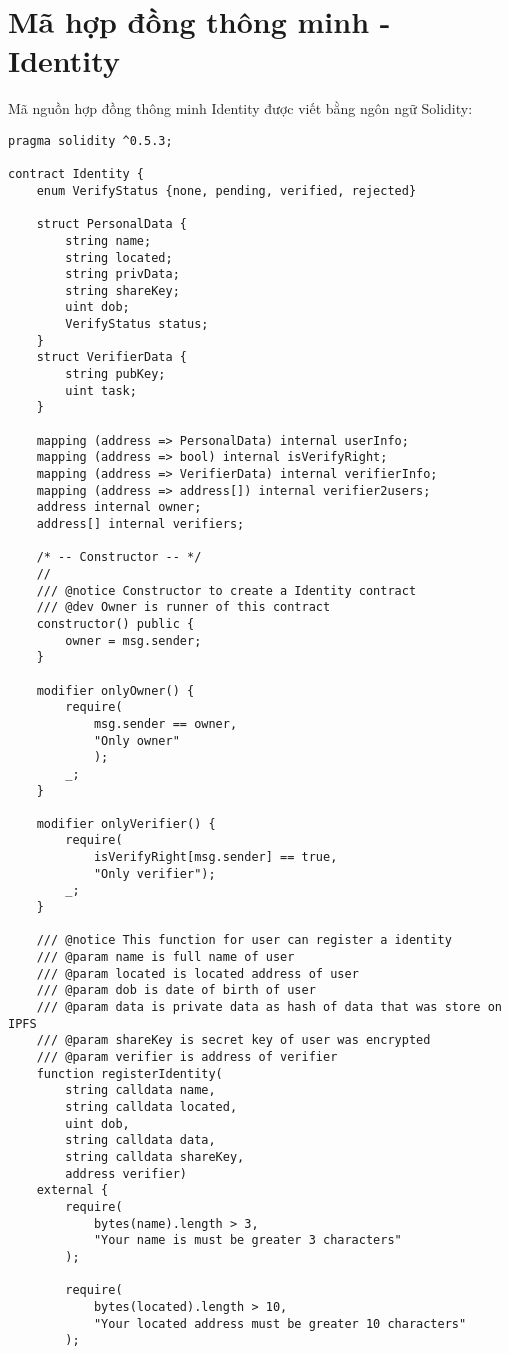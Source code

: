 \documentclass[../main-report.tex]{subfiles}
\begin{document}
\chapter{Mã hợp đồng thông minh - Identity}
Mã nguồn hợp đồng thông minh Identity được viết bằng ngôn ngữ Solidity:

\begin{lstlisting}
pragma solidity ^0.5.3;

contract Identity {
    enum VerifyStatus {none, pending, verified, rejected}

    struct PersonalData {
        string name;
        string located;
        string privData;
        string shareKey;
        uint dob;
        VerifyStatus status;
    }
    struct VerifierData {
        string pubKey;
        uint task;
    }

    mapping (address => PersonalData) internal userInfo;
    mapping (address => bool) internal isVerifyRight;
    mapping (address => VerifierData) internal verifierInfo;
    mapping (address => address[]) internal verifier2users;
    address internal owner;
    address[] internal verifiers;

    /* -- Constructor -- */
    //
    /// @notice Constructor to create a Identity contract
    /// @dev Owner is runner of this contract
    constructor() public {
        owner = msg.sender;
    }

    modifier onlyOwner() {
        require(
            msg.sender == owner,
            "Only owner"
            );
        _;
    }

    modifier onlyVerifier() {
        require(
            isVerifyRight[msg.sender] == true,
            "Only verifier");
        _;
    }

    /// @notice This function for user can register a identity
    /// @param name is full name of user
    /// @param located is located address of user
    /// @param dob is date of birth of user
    /// @param data is private data as hash of data that was store on IPFS
    /// @param shareKey is secret key of user was encrypted
    /// @param verifier is address of verifier
    function registerIdentity(
        string calldata name,
        string calldata located,
        uint dob,
        string calldata data,
        string calldata shareKey,
        address verifier)
    external {
        require(
            bytes(name).length > 3,
            "Your name is must be greater 3 characters"
        );

        require(
            bytes(located).length > 10,
            "Your located address must be greater 10 characters"
        );


\end{lstlisting}
\end{document}
